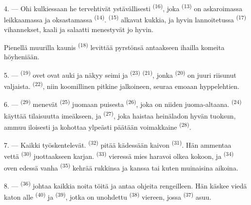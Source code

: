 4. --- Ohi kulkiessaan he tervehtivät ystävällisesti 
\textsuperscript{(16)}, joka  \textsuperscript{(13)} on
askaroimassa leikkaamassa  ja oksastamassa
 \textsuperscript{(14)}. 
\textsuperscript{(15)} alkavat kukkia, ja hyvin lannoitetussa
 \textsuperscript{(17)} vihannekset, kaali ja salaatti
menestyvät jo hyvin.

Pienellä muurilla kaunis  \textsuperscript{(18)} levittää
pyrstönsä antaakseen ihailla komeita höyheniään.

\VUsaut{3.0mm}

5. ---  \textsuperscript{(19)} ovet ovat auki ja näkyy seimi ja
 \textsuperscript{(23)} 
\textsuperscript{(21)}, jonka  \textsuperscript{(20)} on
juuri riisunut valjaista.  \textsuperscript{(22)}, niin
koomillinen pitkine jalkoineen, seuraa emoaan hyppelehtien.

6. ---  \textsuperscript{(29)} menevät 
\textsuperscript{(25)} juomaan puisesta 
\textsuperscript{(26)}, joka on niiden juoma-altaana. 
\textsuperscript{(24)} käyttää tilaisuutta imeäkseen, ja 
\textsuperscript{(27)}, joka haistaa heinäladon hyvän tuoksun, ammuu iloisesti
ja kohottaa ylpeästi päätään voimakkaine 
\textsuperscript{(28)}.

7. --- Kaikki työskentelevät.  \textsuperscript{(32)}
pitää kädessään kaivon  \textsuperscript{(31)}. Hän ammentaa vettä
 \textsuperscript{(30)} juottaakseen karjan. 
\textsuperscript{(33)} vieressä mies haravoi olkea kokoon, ja
 \textsuperscript{(34)} oven edessä vanha
 \textsuperscript{(35)} kehrää rukkinsa ja 
kanssa  tai  kuten muinaisina aikoina.

\VUsaut{3.0mm}
\VUsaut{3.0mm}

8. ---  \textsuperscript{(36)} johtaa kaikkia noita töitä
ja antaa ohjeita rengeilleen. Hän käskee viedä katon alle 
\textsuperscript{(40)} ja  \textsuperscript{(39)}, jotka on
unohdettu  \textsuperscript{(38)} viereen, jossa 
\textsuperscript{(37)} asuu.

